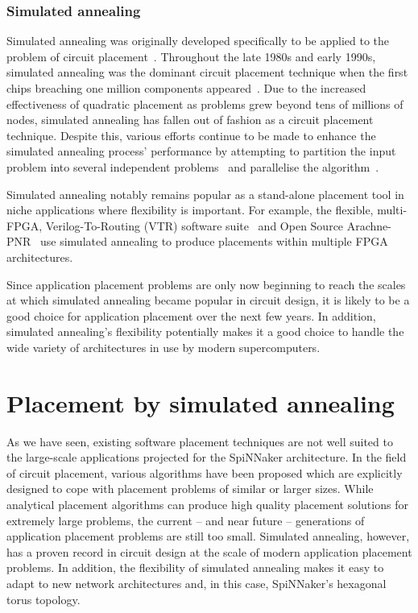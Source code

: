 			
			\subsubsection{Simulated annealing}
				
				Simulated annealing was originally developed specifically to be applied
				to the problem of circuit placement~\cite{kirkpatrick83}. Throughout
				the late 1980s and early 1990s, simulated annealing was the dominant
				circuit placement technique when the first chips breaching one million
				components appeared~\cite{betz97,sechen85}. Due to the increased
				effectiveness of quadratic placement as problems grew beyond tens of
				millions of nodes, simulated annealing has fallen out of fashion as a
				circuit placement technique. Despite this, various efforts continue to
				be made to enhance the simulated annealing process' performance by
				attempting to partition the input problem into several independent
				problems~\cite{choong10,haldar00} and parallelise the
				algorithm~\cite{ludwin08}.
				
				Simulated annealing notably remains popular as a stand-alone placement
				tool in niche applications where flexibility is important. For example,
				the flexible, multi-FPGA, Verilog-To-Routing (VTR) software
				suite~\cite{luu14} and Open Source Arachne-PNR~\cite{cseed} use
				simulated annealing to produce placements within multiple FPGA
				architectures.
				
				Since application placement problems are only now beginning to reach
				the scales at which simulated annealing became popular in circuit
				design, it is likely to be a good choice for application placement over
				the next few years. In addition, simulated annealing's flexibility
				potentially makes it a good choice to handle the wide variety of
				architectures in use by modern supercomputers.
	
	\section{Placement by simulated annealing}
		
		\label{sec:placement-by-annealing}	
		
		As we have seen, existing software placement techniques are not well suited
		to the large-scale applications projected for the SpiNNaker architecture.
		In the field of circuit placement, various algorithms have been proposed
		which are explicitly designed to cope with placement problems of similar or
		larger sizes. While analytical placement algorithms can produce high
		quality placement solutions for extremely large problems, the current --
		and near future -- generations of application placement problems are still
		too small. Simulated annealing, however, has a proven record in circuit
		design at the scale of modern application placement problems. In addition,
		the flexibility of simulated annealing makes it easy to adapt to new
		network architectures and, in this case, SpiNNaker's hexagonal torus
		topology.
		
